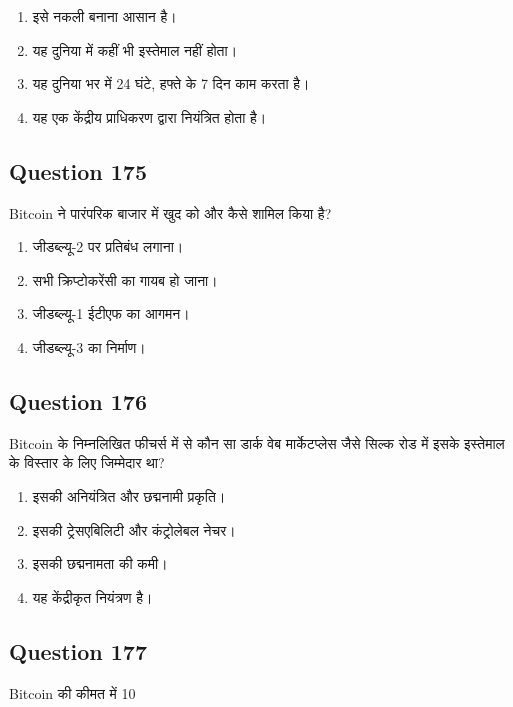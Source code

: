 \documentclass[12pt,a4paper]{article}
\begin{document}
\begin{enumerate}[label=\Alph*., leftmargin=*]
\item इसे नकली बनाना आसान है।
\item यह दुनिया में कहीं भी इस्तेमाल नहीं होता।
\item यह दुनिया भर में 24 घंटे, हफ्ते के 7 दिन काम करता है।
\item यह एक केंद्रीय प्राधिकरण द्वारा नियंत्रित होता है।
\end{enumerate}

\bigskip


\subsection*{Question 175}
Bitcoin ने पारंपरिक बाजार में खुद को और कैसे शामिल किया है?

\begin{enumerate}[label=\Alph*., leftmargin=*]
\item जीडब्ल्यू-2 पर प्रतिबंध लगाना।
\item सभी क्रिप्टोकरेंसी का गायब हो जाना।
\item जीडब्ल्यू-1 ईटीएफ का आगमन।
\item जीडब्ल्यू-3 का निर्माण।
\end{enumerate}

\bigskip


\subsection*{Question 176}
Bitcoin के निम्नलिखित फीचर्स में से कौन सा डार्क वेब मार्केटप्लेस जैसे सिल्क रोड में इसके इस्तेमाल के विस्तार के लिए जिम्मेदार था?

\begin{enumerate}[label=\Alph*., leftmargin=*]
\item इसकी अनियंत्रित और छद्मनामी प्रकृति।
\item इसकी ट्रेसएबिलिटी और कंट्रोलेबल नेचर।
\item इसकी छद्मनामता की कमी।
\item यह केंद्रीकृत नियंत्रण है।
\end{enumerate}

\bigskip


\subsection*{Question 177}
Bitcoin की कीमत में 10%
\end{document}
